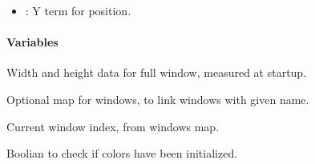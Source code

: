 \documentclass[letterpaper,10pt,english]{sphinxmanual}
\begin{document}
\begin{fulllineitems}
\begin{fulllineitems}
\begin{description}
\begin{itemize}
\item {} 
: Y term for position. 

\end{itemize}

\end{description}


\end{fulllineitems}

\paragraph{Variables}

\begin{fulllineitems}
\label{\detokenize{index:_CPPv2N7ostendo7std_scrE}}%
\pysigstartmultiline
{}%
\pysigstopmultiline
Width and height data for full window, measured at startup. 

\end{fulllineitems}


\begin{fulllineitems}
\label{\detokenize{index:_CPPv2N7ostendo7windowsE}}%
\pysigstartmultiline
{}%
\pysigstopmultiline
Optional map for windows, to link windows with given name. 

\end{fulllineitems}


\begin{fulllineitems}
\label{\detokenize{index:_CPPv2N7ostendo9win_indexE}}%
\pysigstartmultiline
{}%
\pysigstopmultiline
Current window index, from windows map. 

\end{fulllineitems}


\begin{fulllineitems}
\label{\detokenize{index:_CPPv2N7ostendo10color_initE}}%
\pysigstartmultiline
{}%
\pysigstopmultiline
Boolian to check if colors have been initialized. 

\end{fulllineitems}


\end{fulllineitems}
\end{document}

